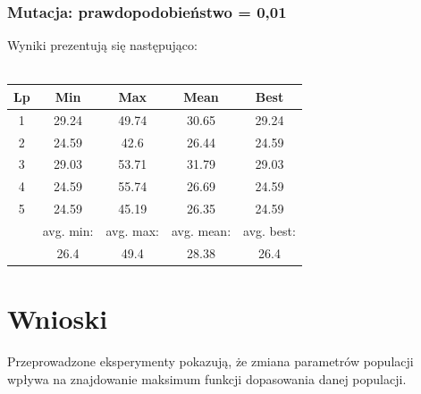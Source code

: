 \documentclass[a4paper,11pt]{article}
\begin{document}
				\subsubsection{Mutacja: prawdopodobieństwo = 0,01}
					Wyniki prezentują się następująco:\\~\\
					\begin{tabular}{|c|c|c|c|c|}
						\hline 
						Lp & Min & Max & Mean & Best \\
						\hline
						1 & 29.24 & 49.74 & 30.65 & 29.24 \\\hline
						2 & 24.59 & 42.6 & 26.44 & 24.59 \\\hline
						3 & 29.03 & 53.71 & 31.79 & 29.03 \\\hline
						4 & 24.59 & 55.74 & 26.69 & 24.59 \\\hline
						5 & 24.59 & 45.19 & 26.35 & 24.59 \\\hline
						&avg. min:&avg. max:&avg. mean:&avg. best:\\\hline
						& 26.4 & 49.4 & 28.38 & 26.4 \\\hline
					\end{tabular}
	\section{Wnioski}
		Przeprowadzone eksperymenty pokazują, że zmiana parametrów populacji wpływa na znajdowanie maksimum funkcji dopasowania danej populacji. 
\end{document}
